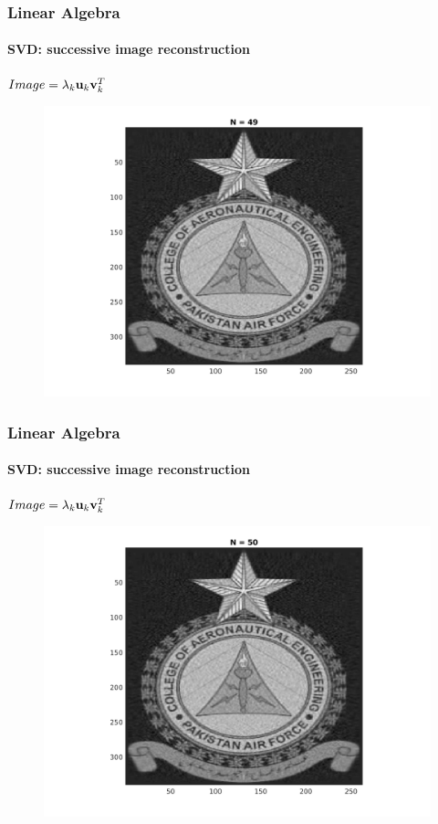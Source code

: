 \documentclass[hyperref={pdfpagelabels=true}]{beamer}
\begin{document}
\begin{frame}
\frametitle{Linear Algebra}
\framesubtitle{SVD: successive image reconstruction} 
\small{
\begin{center}
$Image = \lambda_k{\bf u}_k {\bf v}_k^T$
\end{center}}
\begin{figure}[!htb]
\centering
\includegraphics [scale=0.48]{n/b49.png}
\end{figure}
\end{frame}

\begin{frame}
\frametitle{Linear Algebra}
\framesubtitle{SVD: successive image reconstruction} 
\small{
\begin{center}
$Image = \lambda_k{\bf u}_k {\bf v}_k^T$
\end{center}}
\begin{figure}[!htb]
\centering
\includegraphics [scale=0.48]{n/b50.png}
\end{figure}
\end{frame}
\end{document}
